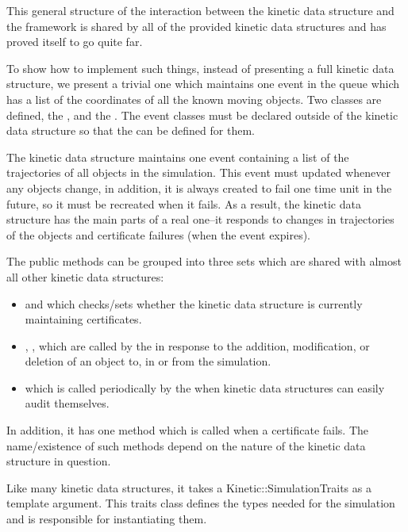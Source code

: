This general structure of the interaction between the kinetic data
structure and the framework is shared by all of the provided kinetic
data structures and has proved itself to go quite far.

To show how to implement such things, instead of presenting a full
kinetic data structure, we present a trivial one which maintains one
event in the queue which has a list of the coordinates of all the
known moving objects.  Two classes are defined, the
, and the
. The event classes must be declared outside of the
kinetic data structure so that the  can be defined for
them. 

The kinetic data structure maintains one event containing a list of
the trajectories of all objects in the simulation. This
event must updated whenever any objects change, in addition, it is
always created to fail one time unit in the future, so it must be
recreated when it fails. As a result, the kinetic data structure has
the main parts of a real one--it responds to changes in trajectories
of the objects and certificate failures (when the event expires).

 The public methods can be grouped into three sets which are shared
 with almost all other kinetic data structures:
\begin{itemize}
\item {} and  which
  checks/sets whether the kinetic data structure is currently
  maintaining certificates.
\item {}, ,  which are called by the
   in response to the
  addition, modification, or deletion of an object to, in or from the
  simulation.
\item {} which is called periodically by the
   when kinetic data structures can
  easily audit themselves.
\end{itemize} 

In addition, it has one method which is called when a certificate
fails. The name/existence of such methods depend on the nature of the
kinetic data structure in question.

Like many kinetic data structures, it takes a Kinetic::SimulationTraits
as a template argument. This traits class defines the types needed for
the simulation and is responsible for instantiating them.

 \label{fig:trivial_usage_program}
